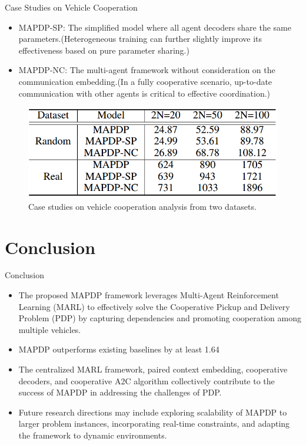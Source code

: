 \documentclass{beamer}
\begin{document}
\begin{frame}{Case Studies on Vehicle Cooperation}
	\small
	\begin{itemize}
		\item MAPDP-SP: The simplified model where all agent decoders share the same parameters.(Heterogeneous training can further slightly improve its effectiveness based on pure parameter sharing.)
		\item MAPDP-NC: The multi-agent framework without consideration on the communication embedding.(In a fully cooperative scenario, up-to-date communication with other agents is critical to effective coordination.)
	\end{itemize}
	\begin{figure}
		\centering
		\includegraphics[scale=0.3]{Ablation.png}
		\caption{Case studies on vehicle cooperation analysis from two datasets.}
	\end{figure}
\end{frame}

\section{Conclusion}

\begin{frame}{Conclusion}
	\begin{itemize}
		\item The proposed MAPDP framework leverages Multi-Agent Reinforcement Learning (MARL) to effectively solve the Cooperative Pickup and Delivery Problem (PDP) by capturing dependencies and promoting cooperation among multiple vehicles.
		\item MAPDP outperforms existing baselines by at least 1.64%
		\item The centralized MARL framework, paired context embedding, cooperative decoders, and cooperative A2C algorithm collectively contribute to the success of MAPDP in addressing the challenges of PDP.
		\item Future research directions may include exploring scalability of MAPDP to larger problem instances, incorporating real-time constraints, and adapting the framework to dynamic environments.
	\end{itemize}
\end{frame}
\end{document}
